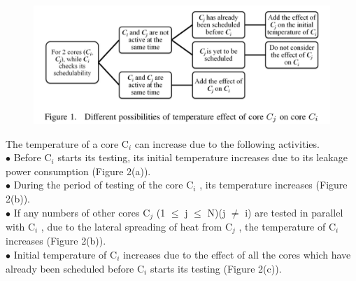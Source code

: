 \documentclass[conference]{IEEEtran}
\begin{document}
\hypertarget{model}{\begin{figure}[ht]
    \center
   \includegraphics[width=\columnwidth]{2.png}
\end{figure}}


	\par
	The temperature of a core C$_{i}$ can increase due to the
following activities.\\
\hspace*{0.5cm}$\bullet$ Before C$_{i}$ starts its testing, its initial temperature increases due
to its leakage power consumption (Figure 2(a)).\\
\hspace*{0.5cm}$\bullet$ During the period of testing of the core C$_{i}$ , its temperature
increases (Figure 2(b)).\\
\hspace*{0.5cm}$\bullet$ If any numbers of other cores C$_{j}$ (1 $\leq$ j $\leq$ N)(j $\neq$ i) are tested
in parallel with C$_{i}$ , due to the lateral spreading of heat from C$_{j}$ ,
the temperature of C$_{i}$ increases (Figure 2(b)). \\
\hspace*{0.5cm}$\bullet$ Initial temperature of C$_{i}$ increases due to the effect of all the
cores which have already been scheduled before C$_{i}$ starts its
testing (Figure 2(c)).\\
\end{document}
